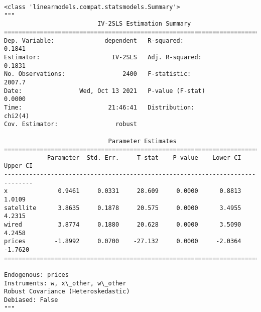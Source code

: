             \begin{tcolorbox}[breakable, size=fbox, boxrule=.5pt, pad at break*=1mm, opacityfill=0]
\begin{Verbatim}[commandchars=\\\{\}]
<class 'linearmodels.compat.statsmodels.Summary'>
"""
                          IV-2SLS Estimation Summary
==============================================================================
Dep. Variable:              dependent   R-squared:                      0.1841
Estimator:                    IV-2SLS   Adj. R-squared:                 0.1831
No. Observations:                2400   F-statistic:                    2007.7
Date:                Wed, Oct 13 2021   P-value (F-stat)                0.0000
Time:                        21:46:41   Distribution:                  chi2(4)
Cov. Estimator:                robust

                             Parameter Estimates
==============================================================================
            Parameter  Std. Err.     T-stat    P-value    Lower CI    Upper CI
------------------------------------------------------------------------------
x              0.9461     0.0331     28.609     0.0000      0.8813      1.0109
satellite      3.8635     0.1878     20.575     0.0000      3.4955      4.2315
wired          3.8774     0.1880     20.628     0.0000      3.5090      4.2458
prices        -1.8992     0.0700    -27.132     0.0000     -2.0364     -1.7620
==============================================================================

Endogenous: prices
Instruments: w, x\_other, w\_other
Robust Covariance (Heteroskedastic)
Debiased: False
"""
\end{Verbatim}
\end{tcolorbox}

